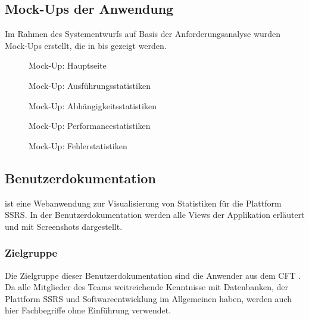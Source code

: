 \subsection{Mock-Ups der Anwendung}
\label{app:Mockup}
Im Rahmen des Systementwurfs auf Basis der Anforderungsanalyse wurden Mock-Ups erstellt, die in  bis  gezeigt werden.
\begin{figure}[htb]
    \centering
    \caption{Mock-Up: Hauptseite}
    \label{fig:Hauptseite}
\end{figure}
\begin{figure}[htb]
    \centering
    \caption{Mock-Up: Ausführungsstatistiken}
\end{figure}
\begin{figure}[htb]
    \centering
    \caption{Mock-Up: Abhängigkeitsstatistiken}
\end{figure}
\begin{figure}[htb]
    \centering
    \caption{Mock-Up: Performancestatistiken}
\end{figure}
\begin{figure}[htb]
    \centering
    \caption{Mock-Up: Fehlerstatistiken}
    \label{fig:Fehlerstatistiken}
\end{figure}

\clearpage

\subsection{Benutzerdokumentation}
\label{app:Benutzerdokumentation}
\projektName ist eine Webanwendung zur Visualisierung von Statistiken für die Plattform \ac{SSRS}. In der Benutzerdokumentation werden alle Views der Applikation erläutert und mit Screenshots dargestellt.

\subsubsection{Zielgruppe}
\label{app:Zielgruppe}
Die Zielgruppe dieser Benutzerdokumentation sind die Anwender aus dem \ac{CFT} \teamName. Da alle Mitglieder des Teams weitreichende Kenntnisse mit Datenbanken, der Plattform \ac{SSRS} und Softwareentwicklung im Allgemeinen haben, werden auch hier Fachbegriffe ohne Einführung verwendet.

